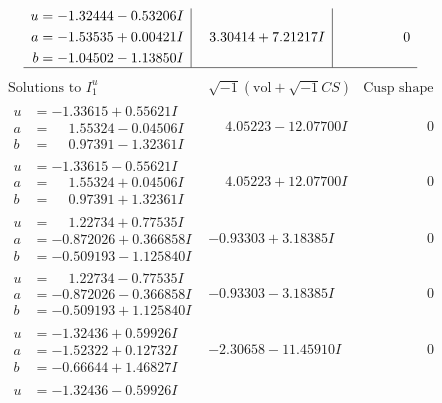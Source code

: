 \documentclass[1p]{elsarticle_modified}
\theoremstyle{definition}
\newcommand{\I}{\sqrt{-1}}
\begin{document}
$$\begin{array}{c|c|c}
\begin{aligned}
u &= -1.32444 - 0.53206 I \\
a &= -1.53535 + 0.00421 I \\
b &= -1.04502 - 1.13850 I\end{aligned}
 & \phantom{-}3.30414 + 7.21217 I & \phantom{-0.000000 } 0\\
 \hline 
 \end{array}$$\newpage$$\begin{array}{c|c|c}  
\text{Solutions to }I^u_{1}& \I (\text{vol} + \sqrt{-1}CS) & \text{Cusp shape}\\
 \hline 
\begin{aligned}
u &= -1.33615 + 0.55621 I \\
a &= \phantom{-}1.55324 - 0.04506 I \\
b &= \phantom{-}0.97391 - 1.32361 I\end{aligned}
 & \phantom{-}4.05223 - 12.07700 I & \phantom{-0.000000 } 0 \\ \hline\begin{aligned}
u &= -1.33615 - 0.55621 I \\
a &= \phantom{-}1.55324 + 0.04506 I \\
b &= \phantom{-}0.97391 + 1.32361 I\end{aligned}
 & \phantom{-}4.05223 + 12.07700 I & \phantom{-0.000000 } 0 \\ \hline\begin{aligned}
u &= \phantom{-}1.22734 + 0.77535 I \\
a &= -0.872026 + 0.366858 I \\
b &= -0.509193 - 1.125840 I\end{aligned}
 & -0.93303 + 3.18385 I & \phantom{-0.000000 } 0 \\ \hline\begin{aligned}
u &= \phantom{-}1.22734 - 0.77535 I \\
a &= -0.872026 - 0.366858 I \\
b &= -0.509193 + 1.125840 I\end{aligned}
 & -0.93303 - 3.18385 I & \phantom{-0.000000 } 0 \\ \hline\begin{aligned}
u &= -1.32436 + 0.59926 I \\
a &= -1.52322 + 0.12732 I \\
b &= -0.66644 + 1.46827 I\end{aligned}
 & -2.30658 - 11.45910 I & \phantom{-0.000000 } 0 \\ \hline\begin{aligned}
u &= -1.32436 - 0.59926 I \\

\end{aligned}
\end{array}$$
\end{document}
